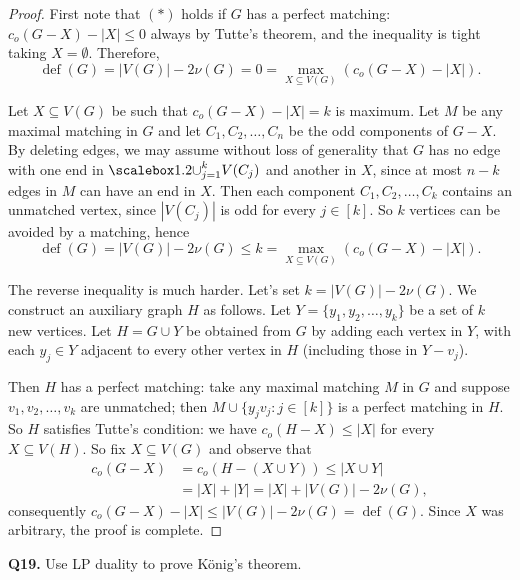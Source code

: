 \begin{proof}
First note that \((\ast)\) holds if \( G \) has a perfect matching: \( c_{o} (G - X) - |X| \leq 0 \) always by Tutte's theorem, and the inequality is tight taking \( X = \emptyset  \). Therefore, \[ \operatorname{def} (G) = |V(G)| - 2 \nu (G) = 0 =  \max_{X \subseteq V(G)} (c_{o} (G - X) - |X|).  \] 

Let \( X \subseteq V(G) \) be such that \( c_{o} (G - X) - |X| = k \) is maximum. Let \( M \) be any maximal matching in \( G \) and let \( C_1, C_2, \hdots , C_{n}  \) be the odd components of \( G - X \). By deleting edges, we may assume without loss of generality that \( G \) has no edge with one end in \( \medcup_{j=1} ^{k} V(C_{j}) \) and another in \( X \), since at most \( n - k \) edges in \( M \) can have an end in \( X \). Then each component \( C_1, C_2, \hdots , C_{k}  \) contains an unmatched vertex, since \( |V(C_{j})| \) is odd for every \( j \in [k] \). So \( k \) vertices can be avoided by a matching, hence \[\operatorname{def} (G) = |V(G)| - 2\nu (G) \leq k = \max _{X \subseteq V(G)} (c_{o} (G - X) - |X|). \] 

The reverse inequality is much harder. Let's set \( k = |V(G)| - 2\nu (G) \). We construct an auxiliary graph \( H \) as follows. Let \( Y = \{ y_1, y_2, \hdots , y_{k}  \}  \) be a set of \( k \) new vertices. Let \( H = G \cup Y \) be obtained from \( G \) by adding each vertex in \( Y \), with each \( y_{j} \in Y \) adjacent to every other vertex in \( H \) (including those in \( Y - v_{j}  \)). 

Then \( H \) has a perfect matching: take any maximal matching \( M \) in \( G \) and suppose \( v_1, v_2, \hdots , v_{k}  \) are unmatched; then \( M \cup \{ y_{j}v_{j} : j \in [k] \}  \) is a perfect matching in \( H \). So \( H \) satisfies Tutte's condition: we have \( c_{o} (H - X) \leq |X| \) for every \( X \subseteq V(H) \). So fix \( X \subseteq V(G) \) and observe that
\begin{align*}
	c_{o} (G - X) &= c_{o} (H - (X \cup Y)) \leq |X \cup Y| \\ 
		      &= |X| + |Y| = |X| + |V(G)| - 2 \nu (G),
\end{align*}
consequently \( c_{o} (G-X) - |X| \leq |V(G)| - 2 \nu (G) = \operatorname{def} (G) \). Since \( X \) was arbitrary, the proof is complete.
\end{proof}
\noindent \textbf{Q19.} Use LP duality to prove K\"onig's theorem.
